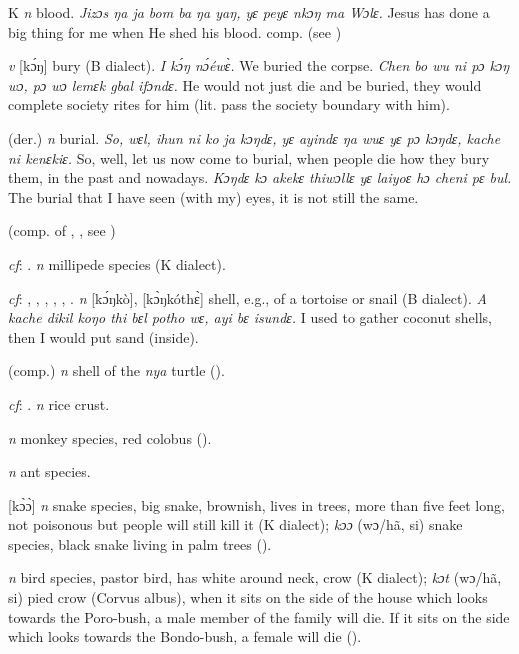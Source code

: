 \begin{letter}{K}
 \textit{n} blood. \textit{Jizɔs ŋa ja bom ba ŋa yaŋ, yɛ peyɛ nkɔŋ ma Wɔlɛ.} Jesus has done a big thing for me when He shed his blood. comp.  (see ) 

 \textit{v} [kɔ́ŋ] bury (B dialect). \textit{I kɔ́ŋ nɔ́éwɛ̀.} We buried the corpse. \textit{Chen bo wu ni pɔ kɔŋ wɔ, pɔ wɔ lemɛk gbal ifɔndɛ.} He would not just die and be buried, they would complete society rites for him (lit. pass the society boundary with him). 

 (der.) \textit{n} burial. \textit{So, wɛl, ihun ni ko ja kɔŋdɛ, yɛ ayindɛ ŋa wuɛ yɛ pɔ kɔŋdɛ, kache ni kenɛkiɛ.} So, well, let us now come to burial, when people die how they bury them, in the past and nowadays. \textit{Kɔŋdɛ kɔ akekɛ thiwɔllɛ yɛ laiyoɛ hɔ cheni pɛ bul.} The burial that I have seen (with my) eyes, it is not still the same.

 (comp. of , , see ) 

 \textit{cf}: . \textit{n} millipede species (K dialect).

 \textit{cf}: , , , , , . \textit{n} [kɔ́ŋkò], [kɔ̀ŋkóthɛ̀] shell, e.g., of a tortoise or snail (B dialect). \textit{A kache dikil koŋo thi bɛl potho wɛ, ayi bɛ isundɛ.} I used to gather coconut shells, then I would put sand (inside).

 (comp.) \textit{n} shell of the \textit{nya} turtle (\citealt{Pichl1967}). 

 \textit{cf}: . \textit{n} rice crust.

 \textit{n} monkey species, red colobus (\citealt{Pichl1967}). 

 \textit{n} ant species.

 [kɔ̀ɔ̀] \textit{n} snake species, big snake, brownish, lives in trees, more than five feet long, not poisonous but people will still kill it (K dialect); \textit{kɔɔ} (wɔ/hã, si) snake species, black snake living in palm trees (\citealt{Pichl1967}). 

 \textit{n} bird species, pastor bird, has white around neck, crow (K dialect); \textit{kɔt} (wɔ/hã, si) pied crow (Corvus albus), when it sits on the side of the house which looks towards the Poro-bush, a male member of the family will die. If it sits on the side which looks towards the Bondo-bush, a female will die (\citealt{Pichl1967}). 


\end{letter}
